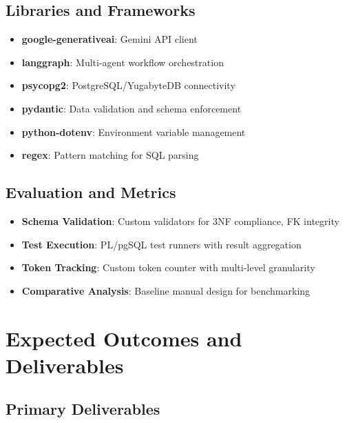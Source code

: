 \documentclass[12pt,a4paper]{article}
\begin{document}
\subsection{Libraries and Frameworks}

\begin{itemize}
\item \textbf{google-generativeai}: Gemini API client
\item \textbf{langgraph}: Multi-agent workflow orchestration
\item \textbf{psycopg2}: PostgreSQL/YugabyteDB connectivity
\item \textbf{pydantic}: Data validation and schema enforcement
\item \textbf{python-dotenv}: Environment variable management
\item \textbf{regex}: Pattern matching for SQL parsing
\end{itemize}

\subsection{Evaluation and Metrics}

\begin{itemize}
\item \textbf{Schema Validation}: Custom validators for 3NF compliance, FK integrity
\item \textbf{Test Execution}: PL/pgSQL test runners with result aggregation
\item \textbf{Token Tracking}: Custom token counter with multi-level granularity
\item \textbf{Comparative Analysis}: Baseline manual design for benchmarking
\end{itemize}

\section{Expected Outcomes and Deliverables}

\subsection{Primary Deliverables}
\end{document}
